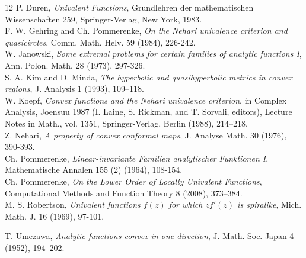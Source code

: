 \documentclass[reqno]{amsart}
\theoremstyle{plain}
\theoremstyle{definition}
\begin{document}
\begin{thebibliography}{12}
P. Duren, \emph{Univalent Functions}, Grundlehren der mathematischen Wissenschaften 259, Springer-Verlag, New York, 1983.\\

F. W. Gehring and Ch. Pommerenke, \emph{On the Nehari univalence criterion and quasicircles}, Comm. Math. Helv. 59 (1984), 226-242.\\

W. Janowski, \emph{Some extremal problems for certain families of analytic functions I}, Ann. Polon. Math. 28 (1973), 297-326.\\

S. A. Kim and D. Minda, \emph{The hyperbolic and quasihyperbolic metrics in convex regions}, J. Analysis 1 (1993), 109–118.\\

W. Koepf, \emph{Convex functions and the Nehari univalence criterion}, in Complex Analysis, Joensuu 1987 (I. Laine, S. Rickman, and T. Sorvali, editors), Lecture Notes in Math., vol. 1351, Springer-Verlag, Berlin (1988), 214–218.\\

Z. Nehari, \emph{A property of convex conformal maps}, J. Analyse Math. 30 (1976), 390-393.\\

Ch. Pommerenke, \emph{Linear-invariante Familien analytischer Funktionen I}, Mathematische Annalen 155 (2) (1964), 108-154.\\

Ch. Pommerenke, \emph{On the Lower Order of Locally Univalent Functions}, Computational Methods and Function Theory 8 (2008), 373–384.\\

M. S. Robertson, \emph{Univalent functions $f(z)$ for which $zf'(z)$ is spiralike}, Mich. Math. J. 16 (1969), 97-101.

T. Umezawa, \emph{Analytic functions convex in one direction}, J. Math. Soc. Japan 4 (1952), 194–202.
\end{thebibliography}
\end{document}
